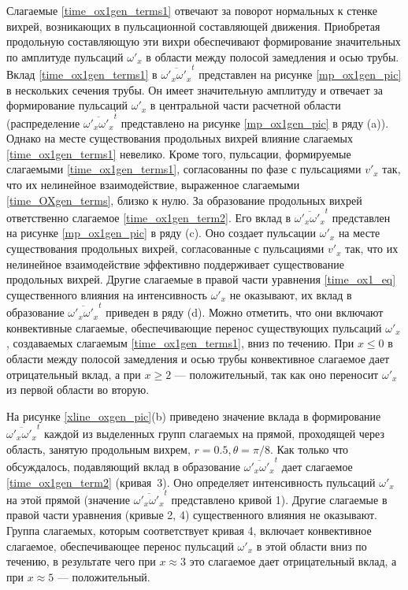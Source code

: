 Слагаемые \eqref{time_ox1gen_terms1} отвечают за поворот нормальных к стенке вихрей, возникающих в пульсационной составляющей движения. Приобретая продольную составляющую эти вихри обеспечивают формирование значительных по амплитуде пульсаций $\omega'_x$ в области между полосой замедления и осью трубы. Вклад \eqref{time_ox1gen_terms1} в $\overline{\omega'_x \omega'_x}^t$ представлен на рисунке \ref{mp_ox1gen_pic} в нескольких сечения трубы. Он имеет значительную амплитуду и отвечает за формирование пульсаций $\omega'_x$ в центральной части расчетной области (распределение $\overline{\omega'_x \omega'_x}^t$ представлено на рисунке \ref{mp_ox1gen_pic} в ряду (a)). Однако на месте существования продольных вихрей влияние слагаемых \eqref{time_ox1gen_terms1} невелико. Кроме того, пульсации, формируемые слагаемыми \eqref{time_ox1gen_terms1}, согласованны по фазе с пульсациями $v'_x$ так, что их нелинейное взаимодействие, выраженное слагаемыми \eqref{time_OXgen_terms}, близко к нулю. За образование продольных вихрей ответственно слагаемое \eqref{time_ox1gen_term2}. Его вклад в $\overline{\omega'_x \omega'_x}^t$ представлен на рисунке \ref{mp_ox1gen_pic} в ряду (c). Оно создает пульсации $\omega'_x$ на месте существования продольных вихрей, согласованные с пульсациями $v'_x$ так, что их нелинейное взаимодействие эффективно поддерживает существование продольных вихрей. Другие слагаемые в правой части уравнения \eqref{time_ox1_eq} существенного влияния на интенсивность $\omega'_x$ не оказывают, их вклад в образование $\overline{\omega'_x \omega'_x}^t$ приведен в ряду (d). Можно отметить, что они включают конвективные слагаемые, обеспечивающие перенос существующих пульсаций $\omega'_x$, создаваемых слагаемым \eqref{time_ox1gen_terms1}, вниз по течению. При $x \le 0$ в области между полосой замедления и осью трубы конвективное слагаемое дает отрицательный вклад, а при $x \ge 2$ --- положительный, так как оно переносит $\omega'_x$ из первой области во вторую.

На рисунке \ref{xline_oxgen_pic}(b) приведено значение вклада в формирование $\overline{\omega'_x \omega'_x}^t$ каждой из выделенных групп слагаемых на прямой, проходящей через область, занятую продольным вихрем, $r = 0.5, \theta = \pi/8$. Как только что обсуждалось, подавляющий вклад в образование $\overline{\omega'_x \omega'_x}^t$  дает слагаемое \eqref{time_ox1gen_term2} (кривая~3). Оно определяет интенсивность пульсаций $\omega'_x$ на этой прямой (значение $\overline{\omega'_x \omega'_x}^t$ представлено кривой 1). Другие слагаемые в правой части уравнения (кривые 2, 4) существенного влияния не оказывают. Группа слагаемых, которым соответствует кривая 4, включает конвективное слагаемое, обеспечивающее перенос пульсаций $\omega'_x$ в этой области вниз по течению, в результате чего при $x \approx 3$ это слагаемое дает отрицательный вклад, а при $x \approx 5$ --- положительный. 

